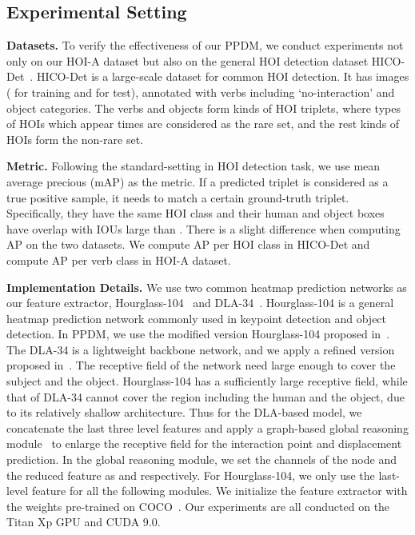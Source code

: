 \documentclass[10pt,twocolumn,letterpaper]{article}
\begin{document}
\subsection{Experimental Setting}
\noindent\textbf{Datasets.} To verify the effectiveness of our PPDM, we conduct experiments not only on our HOI-A dataset but also on the general HOI detection dataset HICO-Det~\cite{chao2018learning}. HICO-Det is a large-scale dataset for common HOI detection. It has  images ( for training and  for test), annotated with  verbs including `no-interaction' and  object categories. The  verbs and  objects form  kinds of HOI triplets, where  types of HOIs which appear  times are considered as the rare set, and the rest  kinds of HOIs form the non-rare set.

\noindent\textbf{Metric.} Following the standard-setting in HOI detection task, we use mean average precious (mAP) as the metric. 
If a predicted triplet is considered as a true positive sample, it needs to match a certain ground-truth triplet. Specifically, they have the same HOI class and their human and object boxes have overlap with IOUs large than .  There is a slight difference when computing AP on the two datasets. We compute AP per HOI class in HICO-Det and compute AP per verb class in HOI-A dataset.

\noindent\textbf{Implementation Details.}
We use two common heatmap prediction networks as our feature extractor, Hourglass-104~\cite{newell2016stacked,law2018cornernet} and DLA-34~\cite{yu2018deep,zhou2019objects}. Hourglass-104 is a general heatmap prediction network commonly used in keypoint detection and object detection. In PPDM, we use the modified version Hourglass-104 proposed in~\cite{law2018cornernet}. The DLA-34 is a lightweight backbone network, and we apply a refined version proposed in~\cite{zhou2019objects}. The receptive field of the network need large enough to cover the subject and the object. Hourglass-104 has a sufficiently large receptive field, while that of DLA-34 cannot cover the region including the human and the object, due to its relatively shallow architecture.  Thus for the DLA-based model, we concatenate the last three level features and apply a graph-based global reasoning module~\cite{chen2019graph} to enlarge the receptive field for the interaction point and displacement prediction. In the global reasoning module, we set the channels of the node and the reduced feature as  and  respectively. For Hourglass-104, we only use the last-level feature for all the following modules. We initialize the feature extractor with the weights pre-trained on COCO~\cite{lin2014microsoft}. Our experiments are all conducted on the Titan Xp GPU and CUDA 9.0.  
\end{document}
